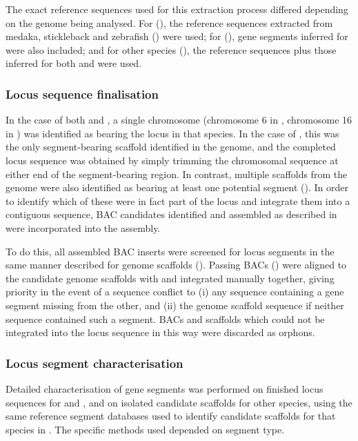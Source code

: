 The exact reference sequences used for this extraction process differed depending on the genome being analysed. For \nfu (), the reference sequences extracted from medaka, stickleback and zebrafish () were used; for \xma (), gene segments inferred for \Nfu were also included; and for other species (), the reference sequences plus those inferred for both \Nfu and \Xma were used.

\subsubsection{Locus sequence finalisation}
\label{sec:methods_comp_locus_final}

In the case of both \nfu and \xma, a single chromosome (chromosome 6 in \Nfu, chromosome 16 in \Xma) was identified as bearing the \igh{} locus in that species. In the case of \Xma, this was the only segment-bearing scaffold identified in the genome, and the completed locus sequence was obtained by simply trimming the chromosomal sequence at either end of the segment-bearing region. In contrast, multiple scaffolds from the \Nfu genome were also identified as bearing at least one potential \igh{} segment (). In order to identify which of these were in fact part of the locus and integrate them into a contiguous sequence, BAC candidates identified and assembled as described in  were incorporated into the assembly.

To do this, all assembled BAC inserts were screened for \igh{} locus segments in the same manner described for genome scaffolds (). Passing BACs () were aligned to the candidate genome scaffolds with  and integrated manually together, giving priority in the event of a sequence conflict to (i) any sequence containing a gene segment missing from the other, and (ii) the genome scaffold sequence if neither sequence contained such a segment. BACs and scaffolds which could not be integrated into the locus sequence in this way were discarded as orphons.

\subsubsection{Locus segment characterisation}
\label{sec:methods_comp_locus_segments}

Detailed characterisation of \igh{} gene segments was performed on finished \igh{} locus sequences for \xma and \nfu, and on isolated candidate scaffolds for other species, using the same reference segment databases used to identify candidate scaffolds for that species in . %
The specific methods used depended on segment type.

